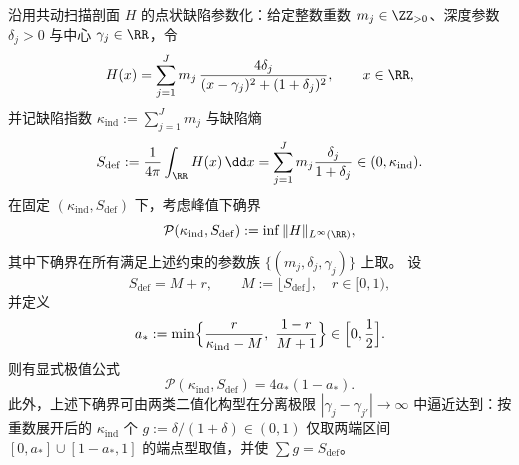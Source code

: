 
\begin{theorem}\label{thm:xi-defect-entropy-peak-compressibility-extremal}
沿用共动扫描剖面 \(H\) 的点状缺陷参数化：给定整数重数 \(m_j\in\ZZ_{>0}\)、深度参数 \(\delta_j>0\) 与中心 \(\gamma_j\in\RR\)，令
\[
H(x)=\sum_{j=1}^{J} m_j\,\frac{4\delta_j}{(x-\gamma_j)^2+(1+\delta_j)^2},
\qquad x\in\RR,
\]
并记缺陷指数
\(
\kappa_{\mathrm{ind}}:=\sum_{j=1}^{J}m_j
\)
与缺陷熵
\[
S_{\mathrm{def}}
:=\frac{1}{4\pi}\int_{\RR}H(x)\,\dd x
=\sum_{j=1}^{J}m_j\frac{\delta_j}{1+\delta_j}\in(0,\kappa_{\mathrm{ind}}).
\]
在固定 \((\kappa_{\mathrm{ind}},S_{\mathrm{def}})\) 下，考虑峰值下确界
\[
\mathcal P(\kappa_{\mathrm{ind}},S_{\mathrm{def}})
:=\inf \|H\|_{L^\infty(\RR)},
\]
其中下确界在所有满足上述约束的参数族 \(\{(m_j,\delta_j,\gamma_j)\}\) 上取。
设
\[
S_{\mathrm{def}}=M+r,\qquad M:=\lfloor S_{\mathrm{def}}\rfloor,\quad r\in[0,1),
\]
并定义
\[
a_\ast:=\min\Bigl\{\frac{r}{\kappa_{\mathrm{ind}}-M},\ \frac{1-r}{M+1}\Bigr\}\in\Bigl[0,\frac12\Bigr].
\]
则有显式极值公式
\[
\mathcal P(\kappa_{\mathrm{ind}},S_{\mathrm{def}})=4a_\ast(1-a_\ast).
\]
此外，上述下确界可由两类二值化构型在分离极限 \(|\gamma_j-\gamma_{j'}|\to\infty\) 中逼近达到：按重数展开后的 \(\kappa_{\mathrm{ind}}\) 个
\(
g:=\delta/(1+\delta)\in(0,1)
\)
仅取两端区间 \([0,a_\ast]\cup[1-a_\ast,1]\) 的端点型取值，并使 \(\sum g=S_{\mathrm{def}}\)。
\end{theorem}

